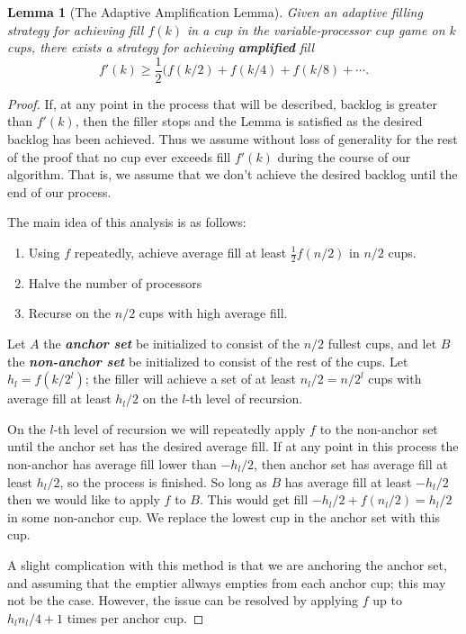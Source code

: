 \documentclass[twocolumn]{article}[11pt]
\newcommand{\defn}[1]{{\textit{\textbf{\boldmath #1}}}}
\newtheorem{lemma}{Lemma}
\begin{document}
\begin{lemma}[The Adaptive Amplification Lemma]
  Given an adaptive filling strategy for achieving fill $f(k)$ in a cup in the 
  variable-processor cup game on $k$ cups, there exists
  a strategy for achieving \defn{amplified} fill 
  $$f'(k) \ge \frac{1}{2}(f(k/2) + f(k/4) + f(k/8) + \cdots .$$
\end{lemma}
\begin{proof}
  If, at any point in the process that will be described, backlog is greater
  than $f'(k)$, then the filler stops and the Lemma is satisfied as the desired
  backlog has been achieved. Thus we assume without loss of generality for
  the rest of the proof that no cup ever exceeds fill $f'(k)$ during the course
  of our algorithm. That is, we assume that we don't achieve the desired
  backlog until the end of our process.

  The main idea of this analysis is as follows:
  \begin{enumerate}
    \item Using $f$ repeatedly, achieve average fill at least $\frac{1}{2} f(n/2)$ in $n/2$ cups.
    \item Halve the number of processors
    \item Recurse on the $n/2$ cups with high average fill.
  \end{enumerate}

  Let $A$ the \defn{anchor set} be initialized to consist of the $n/2$ fullest
  cups, and let $B$ the \defn{non-anchor set} be initialized to consist of the
  rest of the cups.
  Let $h_l = f(k/2^l)$; the filler will achieve a set of at
  least $n_l/2 = n/2^l$ cups with average fill at least $h_l / 2$ on the $l$-th
  level of recursion. 

  On the $l$-th level of recursion we will repeatedly apply $f$ to the
  non-anchor set until the anchor set has the desired average fill. If at any
  point in this process the non-anchor has average fill lower than $-h_l/2$,
  then anchor set has average fill at least $h_l/2$, so the process is
  finished. So long as $B$ has average fill at least $-h_l/2$ then we would
  like to apply $f$ to $B$. This would get fill $-h_l/2 + f(n_l/2) = h_l/2$ in
  some non-anchor cup. We replace the lowest cup in the anchor set with this
  cup. 

  A slight complication with this method is that we are anchoring the anchor
  set, and assuming that the emptier allways empties from each anchor cup; this
  may not be the case. However, the issue can be resolved by applying $f$ up to
  $h_ln_l/4+1$ times per anchor cup.


\end{proof}
\end{document}
